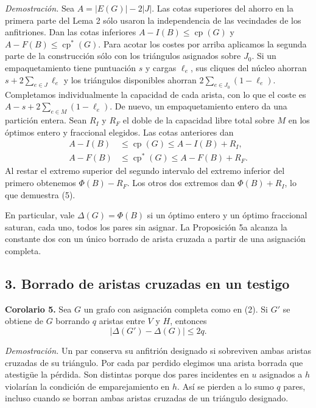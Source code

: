 \documentclass[spanish,11pt,a4paper]{article}
\begin{document}
\emph{Demostración.} Sea \(A=|E(G)|-2|J|\). Las cotas superiores del ahorro en la primera parte del Lema 2 sólo usaron la independencia de las vecindades de los anfitriones. Dan las cotas inferiores \(A-I(B)\le\operatorname{cp}(G)\) y \(A-F(B)\le\operatorname{cp}^{\ast}(G)\). Para acotar los costes por arriba aplicamos la segunda parte de la construcción sólo con los triángulos asignados sobre \(J_0\). Si un empaquetamiento tiene puntuación \(s\) y cargas \(\ell_e\), sus cliques del núcleo ahorran \(s+2\sum_{e\in J}\ell_e\) y los triángulos disponibles ahorran \(2\sum_{e\in J_0}(1-\ell_e)\). Completamos individualmente la capacidad de cada arista, con lo que el coste es \(A-s+2\sum_{e\in M}(1-\ell_e)\). De nuevo, un empaquetamiento entero da una partición entera. Sean \(R_I\) y \(R_F\) el doble de la capacidad libre total sobre \(M\) en los óptimos entero y fraccional elegidos. Las cotas anteriores dan \[
\begin{aligned}
A-I(B)&\le\operatorname{cp}(G)\le A-I(B)+R_I,\\
A-F(B)&\le\operatorname{cp}^{\ast}(G)\le A-F(B)+R_F.
\end{aligned}
\] Al restar el extremo superior del segundo intervalo del extremo inferior del primero obtenemos \(\Phi(B)-R_F\). Los otros dos extremos dan \(\Phi(B)+R_I\), lo que demuestra (5).

En particular, vale \(\Delta(G)=\Phi(B)\) si un óptimo entero y un óptimo fraccional saturan, cada uno, todos los pares sin asignar. La Proposición 5a alcanza la constante dos con un único borrado de arista cruzada a partir de una asignación completa.

\subsection{3. Borrado de aristas cruzadas en un testigo}\label{borrado-de-aristas-cruzadas-en-un-testigo}

\textbf{Corolario 5.} Sea \(G\) un grafo con asignación completa como en (2). Si \(G'\) se obtiene de \(G\) borrando \(q\) aristas entre \(V\) y \(H\), entonces
\[
|\Delta(G')-\Delta(G)|\le 2q. \tag{6}
\]

\emph{Demostración.} Un par conserva su anfitrión designado si sobreviven ambas aristas cruzadas de su triángulo. Por cada par perdido elegimos una arista borrada que atestigüe la pérdida. Son distintas porque dos pares incidentes en \(u\) asignados a \(h\) violarían la condición de emparejamiento en \(h\). Así se pierden a lo sumo \(q\) pares, incluso cuando se borran ambas aristas cruzadas de un triángulo designado.
\end{document}
